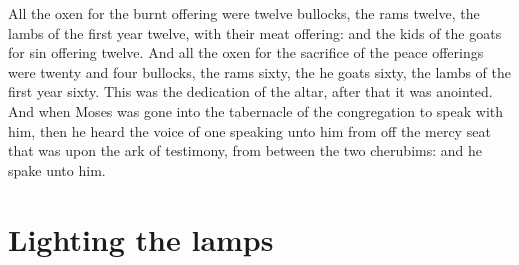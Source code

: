 \begin{biblechapter}
\verse All the oxen for the burnt offering were twelve bullocks, the rams twelve, the lambs of the first year twelve, with their meat offering: and the kids of the goats for sin offering twelve.
\verse And all the oxen for the sacrifice of the peace offerings were twenty and four bullocks, the rams sixty, the he goats sixty, the lambs of the first year sixty. This was the dedication of the altar, after that it was anointed.
\verse And when Moses was gone into the tabernacle of the congregation to speak with him, then he heard the voice of one speaking unto him from off the mercy seat that was upon the ark of testimony, from between the two cherubims: and he spake unto him.
\end{biblechapter}

\section*{Lighting the lamps}
